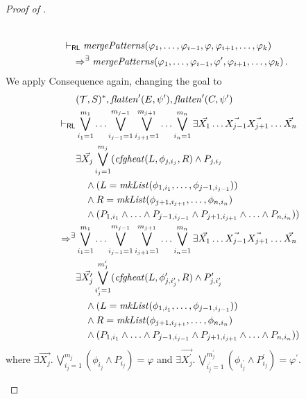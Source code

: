 \begin{proof}[Proof of ]
\begin{enumerate}
\begin{align*}
        \\& \vdash_{\mathsf{RL}}
        \mathit{mergePatterns}(\varphi_1, \ldots, \varphi_{i-1}, \varphi, \varphi_{i+1}, \ldots, \varphi_k)
        \\&\quad \Rightarrow^\exists
        \mathit{mergePatterns}(\varphi_1, \ldots, \varphi_{i-1}, \varphi^\prime, \varphi_{i+1}, \ldots, \varphi_k) \, .
    \end{align*}
    We apply Consequence again, changing the goal to
    \begin{align*}
        & (\mathcal{T}, S)^*, \mathit{flatten}^\prime(E, \psi^\prime), \mathit{flatten}^\prime(C, \psi^\prime)
        \\ \vdash_{\mathsf{RL}} &
        \bigvee_{i_1=1}^{m_1} \ldots \bigvee_{i_{j-1}=1}^{m_{j-1}}
        \bigvee_{i_{j+1}=1}^{m_{j+1}} \ldots \bigvee_{i_n=1}^{m_n}
        \exists \vec{X_1} \ldots \vec{X_{j-1}} \vec{X_{j+1}} \ldots \vec{X_n}
        \\& \exists \vec{X_j} \bigvee_{i_j=1}^{m_j} (\mathit{cfgheat}(L, \phi_{j, i_j}, R) \land P_{j, i_j}
        \\&\quad \land (L = \mathit{mkList}(\phi_{1, i_1}, \ldots, \phi_{j-1, i_{j-1}}))
        \\&\quad \land R = \mathit{mkList}(\phi_{j+1, i_{j+1}}, \ldots, \phi_{n, i_{n}})
        \\&\quad \land (P_{1, i_1} \land \ldots \land P_{j-1, i_{j-1}} \land P_{j+1, i_{j+1}} \land \ldots \land P_{n, i_n}))
        \\ \Rightarrow^\exists &
        \bigvee_{i_1=1}^{m_1} \ldots \bigvee_{i_{j-1}=1}^{m_{j-1}}
        \bigvee_{i_{j+1}=1}^{m_{j+1}} \ldots \bigvee_{i_n=1}^{m_n}
        \exists \vec{X_1} \ldots \vec{X_{j-1}} \vec{X_{j+1}} \ldots \vec{X_n}
        \\& \exists \vec{X^\prime_j} \bigvee_{i^\prime_j=1}^{m^\prime_j} (\mathit{cfgheat}(L, \phi^\prime_{j, i^\prime_j}, R) \land P^\prime_{j, i^\prime_j}
        \\&\quad \land (L = \mathit{mkList}(\phi_{1, i_1}, \ldots, \phi_{j-1, i_{j-1}}))
        \\&\quad \land R = \mathit{mkList}(\phi_{j+1, i_{j+1}}, \ldots, \phi_{n, i_{n}})
        \\&\quad \land (P_{1, i_1} \land \ldots \land P_{j-1, i_{j-1}} \land P_{j+1, i_{j+1}} \land \ldots \land P_{n, i_n}))
    \end{align*}
    where $\exists \vec{X_j}.\, \bigvee_{i_j = 1}^{m_j} (\phi_{i_j} \land P_{i_j}) = \varphi $
    and $\exists \vec{X_j^\prime}.\, \bigvee_{i_j^\prime = 1}^{m_j^\prime} (\phi_{i_j^\prime} \land P_{i_j}^\prime) = \varphi^\prime$.

\end{enumerate}
\end{proof}
